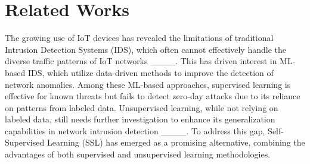 \section{Related Works}
The growing use of IoT devices has revealed the limitations of traditional Intrusion Detection Systems (IDS), which often cannot effectively handle the diverse traffic patterns of IoT networks ____. This has driven interest in ML-based IDS, which utilize data-driven methods to improve the detection of network anomalies. Among these ML-based approaches, supervised learning is effective for known threats but fails to detect zero-day attacks due to its reliance on patterns from labeled data. Unsupervised learning, while not relying on labeled data, still needs further investigation to enhance its generalization capabilities in network intrusion detection ____. To address this gap, Self-Supervised Learning (SSL) has emerged as a promising alternative, combining the advantages of both supervised and unsupervised learning methodologies. 

